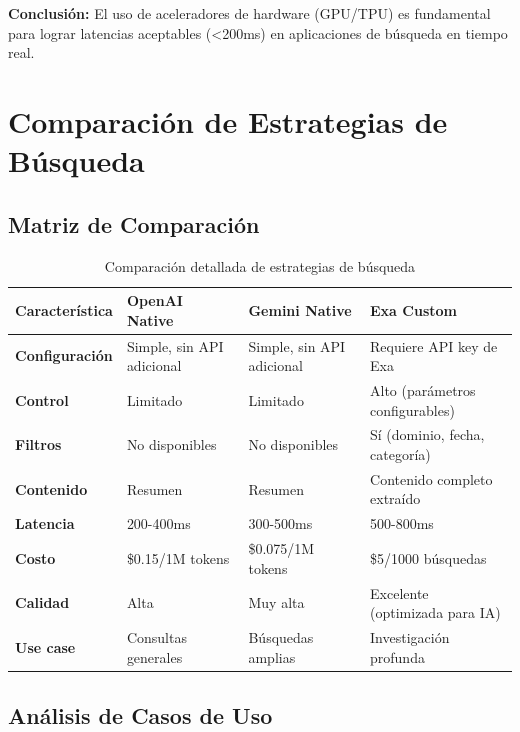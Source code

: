 \documentclass[12pt,a4paper]{article}
\begin{document}
\textbf{Conclusión:} El uso de aceleradores de hardware (GPU/TPU) es fundamental para lograr latencias aceptables (<200ms) en aplicaciones de búsqueda en tiempo real.

\newpage

\section{Comparación de Estrategias de Búsqueda}

\subsection{Matriz de Comparación}

\begin{table}[H]
\centering
\small
\begin{tabular}{|l|p{3cm}|p{3cm}|p{3cm}|}
\hline
\textbf{Característica} & \textbf{OpenAI Native} & \textbf{Gemini Native} & \textbf{Exa Custom} \\
\hline
\textbf{Configuración} & Simple, sin API adicional & Simple, sin API adicional & Requiere API key de Exa \\
\hline
\textbf{Control} & Limitado & Limitado & Alto (parámetros configurables) \\
\hline
\textbf{Filtros} & No disponibles & No disponibles & Sí (dominio, fecha, categoría) \\
\hline
\textbf{Contenido} & Resumen & Resumen & Contenido completo extraído \\
\hline
\textbf{Latencia} & 200-400ms & 300-500ms & 500-800ms \\
\hline
\textbf{Costo} & \$0.15/1M tokens & \$0.075/1M tokens & \$5/1000 búsquedas \\
\hline
\textbf{Calidad} & Alta & Muy alta & Excelente (optimizada para IA) \\
\hline
\textbf{Use case} & Consultas generales & Búsquedas amplias & Investigación profunda \\
\hline
\end{tabular}
\caption{Comparación detallada de estrategias de búsqueda}
\end{table}

\subsection{Análisis de Casos de Uso}
\end{document}
